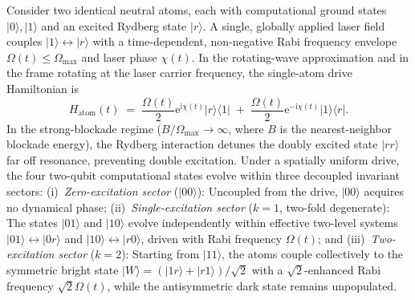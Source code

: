 \documentclass[aps,prx,reprint,nofootinbib,longbibliography,floatfix]{revtex4-2}
\theoremstyle{plain}
\theoremstyle{remark}
\newcommand{\Omax}{\Omega_{\max}}
\newcommand{\ee}{\mathrm{e}}
\newcommand{\ii}{\mathrm{i}}
\newcommand{\bket}[1]{|#1\rangle}
\newcommand{\bbra}[1]{\langle #1|}
\begin{document}
Consider two identical neutral atoms, each with computational ground states $\bket0, \bket1$ and an excited Rydberg state $\bket r$. A single, globally applied laser field couples $\bket1 \leftrightarrow \bket r$ with a time-dependent, non-negative Rabi frequency envelope $\Omega(t) \le \Omax$ and laser phase $\chi(t)$. In the rotating-wave approximation and in the frame rotating at the laser carrier frequency, the single-atom drive Hamiltonian is
\begin{equation}
H_{\mathrm{atom}}(t) \;=\; \frac{\Omega(t)}{2}\ee^{\ii\chi(t)}\bket{r}\bbra{1} \;+\; \frac{\Omega(t)}{2}\ee^{-\ii\chi(t)}\bket{1}\bbra{r}.
\label{eq:Hatom}
\end{equation}
In the strong-blockade regime ($B/\Omax \to \infty$, where $B$ is the nearest-neighbor blockade energy), the Rydberg interaction detunes the doubly excited state $\bket{rr}$ far off resonance, preventing double excitation. Under a spatially uniform drive, the four two-qubit computational states evolve within three decoupled invariant sectors:
(i)~\emph{Zero-excitation sector} ($\bket{00}$): Uncoupled from the drive, $\bket{00}$ acquires no dynamical phase;
(ii)~\emph{Single-excitation sector} ($k=1$, two-fold degenerate): The states $\bket{01}$ and $\bket{10}$ evolve independently within effective two-level systems $\bket{01} \leftrightarrow \bket{0r}$ and $\bket{10} \leftrightarrow \bket{r0}$, driven with Rabi frequency $\Omega(t)$; and
(iii)~\emph{Two-excitation sector} ($k=2$): Starting from $\bket{11}$, the atoms couple collectively to the symmetric bright state $\bket{W} = (\bket{1r}+\bket{r1})/\sqrt{2}$ with a $\sqrt{2}$-enhanced Rabi frequency $\sqrt{2}\Omega(t)$, while the antisymmetric dark state remains unpopulated.
\end{document}
